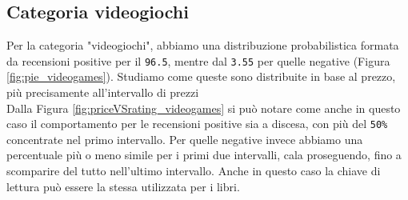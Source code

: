 		
			\subsection{Categoria videogiochi}
				Per la categoria "videogiochi", abbiamo una distribuzione probabilistica formata da recensioni positive per il \verb|96.5|, mentre dal \verb|3.55| per quelle negative (Figura \ref{fig:pie_videogames}). Studiamo come queste sono distribuite in base al prezzo, più precisamente all'intervallo di prezzi\\
				Dalla Figura \ref{fig:priceVSrating_videogames} si può notare come anche in questo caso il comportamento per le recensioni positive sia a discesa, con più del \verb|50%| concentrate nel primo intervallo. Per quelle negative invece abbiamo una percentuale più o meno simile per i primi due intervalli, cala proseguendo, fino a scomparire del tutto nell'ultimo intervallo. Anche in questo caso la chiave di lettura può essere la stessa utilizzata per i libri. 
			
